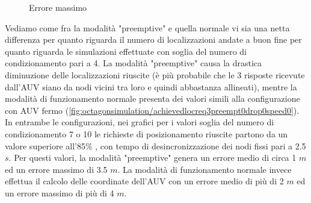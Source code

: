 \documentclass[Lau,binding=0.6cm]{sapthesis}
\begin{document}
\begin{figure}[H]
    \centering
    \hfill
    \caption{Errore massimo}
\end{figure}
Vediamo come fra la modalità "preemptive" e quella normale vi sia una netta differenza per quanto riguarda il numero di localizzazioni andate a buon fine per quanto riguarda le simulazioni effettuate con soglia del numero di condizionamento pari a 4. La modalità "preemptive" causa la drastica diminuzione delle localizzazioni riuscite (è più probabile che le 3 risposte ricevute dall'AUV siano da nodi vicini tra loro e quindi abbastanza allineati), mentre la modalità di funzionamento normale presenta dei valori simili alla configurazione con AUV fermo (\ref{fig:octagonsimulation/achievedlocreq3preempt0drop0speed0}).
In entrambe le configurazioni, nei grafici per i valori soglia del numero di condizionamento 7 o 10 le richieste di posizionamento riuscite partono da un valore superiore all'85\% , con tempo di desincronizzazione dei nodi fissi pari a 2.5 $s$.
Per questi valori, la modalità "preemptive" genera un errore medio di circa 1 $m$ ed un errore massimo di 3.5 $m$. La modalità di funzionamento normale invece effettua il calcolo delle coordinate dell'AUV con un errore medio di più di 2 $m$ ed un errore massimo di più di 4 $m$.
\end{document}
